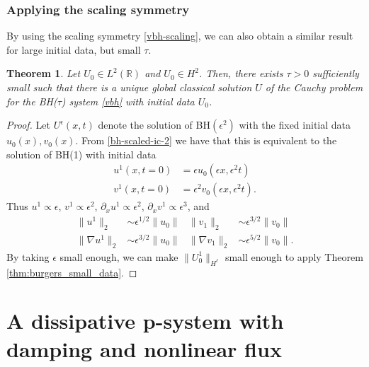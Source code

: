 \documentclass{article}
\theoremstyle{plain}
\newtheorem{theorem}{Theorem}
\theoremstyle{definition}
\numberwithin{theorem}{section}
\begin{document}
\subsubsection{Applying the scaling symmetry}
By using the scaling symmetry \eqref{vbh-scaling}, we can also obtain a similar result for large initial data, but small $\tau$.
\begin{theorem}
\label{thm:bh_small_tau}
    Let
    $U_0 \in L^2(\mathbb{R})$ and
    $U_0 \in H^2$.
    Then, there exists $\tau > 0$ sufficiently small such that
    there is a unique global classical solution $U$ of the Cauchy problem for the BH($\tau$) system \eqref{vbh}
    with initial data $U_0$.
\end{theorem}
\begin{proof}
    Let $U^\epsilon(x,t)$ denote the solution of
    BH$(\epsilon^2)$ with the fixed initial data $u_0(x),v_0(x)$.  From \eqref{bh-scaled-ic-2}
    we have that this is equivalent to the solution of BH(1) with initial data
    \begin{align*}
        u^1(x,t=0) & = \epsilon u_0(\epsilon x, \epsilon^2 t) \\
        v^1(x,t=0) & = \epsilon^2 v_0(\epsilon x, \epsilon^2 t).
    \end{align*}
    Thus $u^1 \propto \epsilon$, $v^1\propto \epsilon^2$, $\partial_x u^1 \propto \epsilon^2$,
    $\partial_x v^1 \propto \epsilon^3$, and
    \begin{align*}
        \|u^1\|_2 & \sim \epsilon^{1/2} \|u_0\| & \|v_1\|_2 & \sim \epsilon^{3/2} \|v_0\| \\
        \|\nabla u^1\|_2 & \sim \epsilon^{3/2} \|u_0\| & \|\nabla v_1\|_2 & \sim \epsilon^{5/2}\|v_0\| .
    \end{align*}
    By taking $\epsilon$ small enough, 
    we can make $\|U^1_0\|_{H^\ell}$ small enough to apply Theorem \ref{thm:burgers_small_data}.
\end{proof}



\section{A dissipative p-system   with damping and  nonlinear flux}
\end{document}
